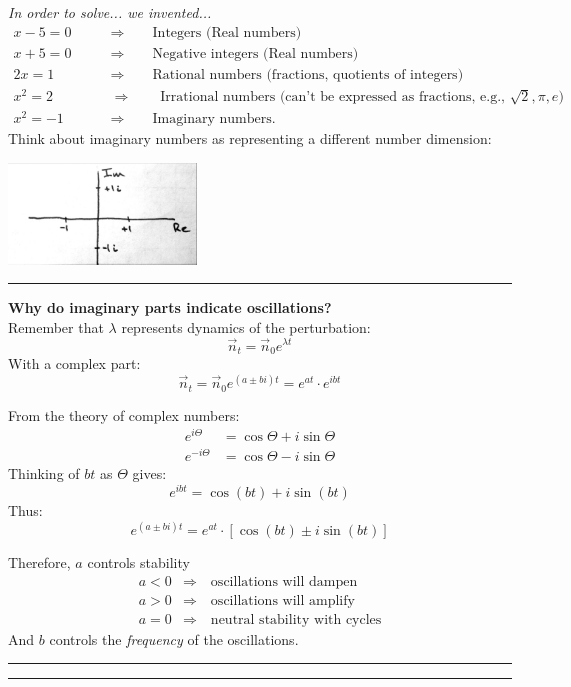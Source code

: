 \documentclass{article}
\begin{document}
\emph{In order to solve... we invented...}
\begin{align*}
	x-5 = 0 \qquad &\Rightarrow \qquad \text{Integers (Real numbers)}\\
	x+5 = 0 \qquad &\Rightarrow \qquad \text{Negative integers (Real numbers)}\\
	2x = 1 \qquad &\Rightarrow \qquad \text{Rational numbers (fractions, quotients of integers)}\\
	x^2 = 2 \qquad &\Rightarrow \qquad \text{Irrational numbers (can't be expressed as fractions, e.g., }\sqrt{2}, \pi, e)\\
	x^2= -1 \qquad &\Rightarrow \qquad \text{Imaginary numbers.}
\end{align*}
Think about imaginary numbers as representing a different number dimension:
 \begin{center}
 	\includegraphics[width=5cm]{figs/Imag.pdf}
 \end{center}
 
\rule[0.5ex]{\linewidth}{1pt}

\textbf{Why do imaginary parts indicate oscillations?}\\
Remember that $\lambda$ represents dynamics of the perturbation:
\begin{equation*}
	\vec{n}_t = \vec{n}_0 e^{\lambda t}
\end{equation*}
With a complex part:
\begin{equation*}
	\vec{n}_t = \vec{n}_0 e^{(a \pm bi) t} = e^{at} \cdot e^{i bt}
\end{equation*}

From the theory of complex numbers:
\begin{align*}
	e^{i \Theta} &= \cos \Theta + i \sin \Theta \\ 
	e^{-i \Theta} &= \cos \Theta - i \sin \Theta
\end{align*}
Thinking  of $bt$ as $\Theta$ gives:
\begin{equation*}
	e^{i bt} = \cos (bt) + i\sin (bt)
\end{equation*} 
Thus:
\begin{equation*}
	e^{(a \pm bi) t} =  e^{at} \cdot  [\cos (bt) \pm i\sin (bt)]
\end{equation*} 

Therefore, $a$ controls stability
\begin{align*}
	a<0 &\Rightarrow \quad \text{oscillations will dampen}\\
	a>0 &\Rightarrow \quad \text{oscillations will amplify}\\
	a=0 &\Rightarrow \quad \text{neutral stability with cycles}
\end{align*}
And $b$ controls the \emph{frequency} of the oscillations.

 
\rule[0.5ex]{\linewidth}{1pt}
\rule[0.5ex]{\linewidth}{1pt}
\end{document}
